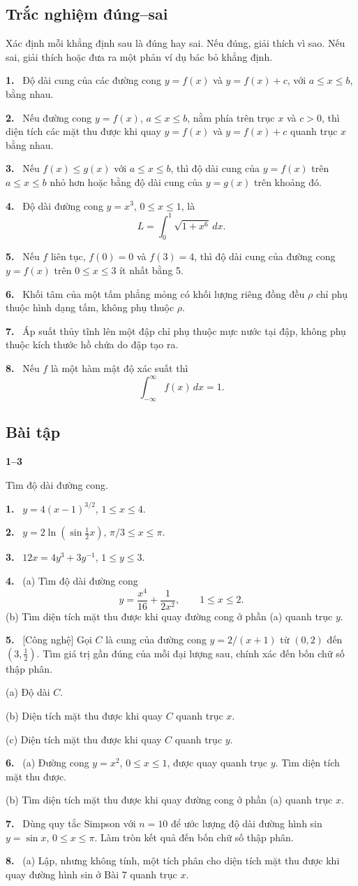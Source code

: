 \documentclass[12pt,a4paper]{article}
\newcommand{\bt}[1]{\par\smallskip\Needspace{5\baselineskip}\noindent\textbf{#1.}\ }
\newcommand{\group}[1]{\par\Needspace{11\baselineskip}\medskip\noindent\textbf{#1}\par\nopagebreak[4]}
\newcommand{\ds}[1]{\bt{#1}}
\begin{document}
\subsection*{Trắc nghiệm đúng–sai}
Xác định mỗi khẳng định sau là đúng hay sai. Nếu đúng, giải thích vì sao. Nếu sai, giải thích hoặc đưa ra một phản ví dụ bác bỏ khẳng định.
\ds{1} Độ dài cung của các đường cong $y=f(x)$ và $y=f(x)+c$, với $a\le x\le b$, bằng nhau.
\ds{2} Nếu đường cong $y=f(x)$, $a\le x\le b$, nằm phía trên trục $x$ và $c>0$, thì diện tích các mặt thu được khi quay $y=f(x)$ và $y=f(x)+c$ quanh trục $x$ bằng nhau.
\ds{3} Nếu $f(x)\le g(x)$ với $a\le x\le b$, thì độ dài cung của $y=f(x)$ trên $a\le x\le b$ nhỏ hơn hoặc bằng độ dài cung của $y=g(x)$ trên khoảng đó.
\ds{4} Độ dài đường cong $y=x^3$, $0\le x\le1$, là
\[L=\int_{0}^{1}\sqrt{1+x^6}\,dx.\]
\ds{5} Nếu $f$ liên tục, $f(0)=0$ và $f(3)=4$, thì độ dài cung của đường cong $y=f(x)$ trên $0\le x\le3$ ít nhất bằng 5.
\ds{6} Khối tâm của một tấm phẳng mỏng có khối lượng riêng đồng đều $\rho$ chỉ phụ thuộc hình dạng tấm, không phụ thuộc $\rho$.
\ds{7} Áp suất thủy tĩnh lên một đập chỉ phụ thuộc mực nước tại đập, không phụ thuộc kích thước hồ chứa do đập tạo ra.
\ds{8} Nếu $f$ là một hàm mật độ xác suất thì
\[\int_{-\infty}^{\infty}f(x)\,dx=1.\]
\subsection*{Bài tập}
\group{1–3} Tìm độ dài đường cong.
\bt{1} $y=4(x-1)^{3/2}$, $1\le x\le4$.
\bt{2} $y=2\ln(\sin\tfrac12x)$, $\pi/3\le x\le\pi$.
\bt{3} $12x=4y^3+3y^{-1}$, $1\le y\le3$.
\bt{4} (a) Tìm độ dài đường cong
\[y=\frac{x^4}{16}+\frac1{2x^2},\qquad1\le x\le2.\]
(b) Tìm diện tích mặt thu được khi quay đường cong ở phần (a) quanh trục $y$.
\bt{5} [Công nghệ] Gọi $C$ là cung của đường cong $y=2/(x+1)$ từ $(0,2)$ đến $(3,\tfrac12)$. Tìm giá trị gần đúng của mỗi đại lượng sau, chính xác đến bốn chữ số thập phân.

(a) Độ dài $C$.

(b) Diện tích mặt thu được khi quay $C$ quanh trục $x$.

(c) Diện tích mặt thu được khi quay $C$ quanh trục $y$.
\bt{6} (a) Đường cong $y=x^2$, $0\le x\le1$, được quay quanh trục $y$. Tìm diện tích mặt thu được.

(b) Tìm diện tích mặt thu được khi quay đường cong ở phần (a) quanh trục $x$.
\bt{7} Dùng quy tắc Simpson với $n=10$ để ước lượng độ dài đường hình sin $y=\sin x$, $0\le x\le\pi$. Làm tròn kết quả đến bốn chữ số thập phân.
\bt{8} (a) Lập, nhưng không tính, một tích phân cho diện tích mặt thu được khi quay đường hình sin ở Bài 7 quanh trục $x$.
\end{document}
